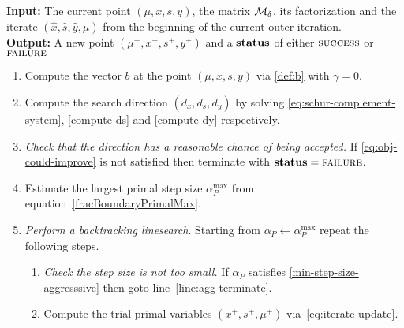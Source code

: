 \documentclass{article}
\begin{document}
\begin{algorithm}[H]
\textbf{Input:} The current point $(\mu, x, s, y)$, the matrix $\mathcal{M}_{\delta}$, its factorization and the iterate $(\hat{x}, \hat{s},  \hat{y}, \hat{\mu})$ from the beginning of the current outer iteration.  \\
\textbf{Output:} A new point $(\mu^{+}, x^{+}, s^{+}, y^{+})$ and a $\textbf{status}$ of either $\textsc{success}$ or $\textsc{failure}$
\begin{enumerate}[label*=A.{\arabic*}]
\item Compute the vector $b$ at the point $(\mu, x, s, y)$ via \eqref{def:b} with $\gamma = 0$.
\item Compute the search direction $(d_{x}, d_{s}, d_{y})$ by solving \eqref{eq:schur-complement-system}, \eqref{compute-ds} and \eqref{compute-dy} respectively.
\item \emph{Check that the direction has a reasonable chance of being accepted.} If \eqref{eq:obj-could-improve} is not satisfied then terminate with $\textbf{status} = \textsc{failure}$.
\item Estimate the largest primal step size $\alpha^{\max}_{P}$ from equation~\eqref{fracBoundaryPrimalMax}.
\item \label{agg:line:back-track} \emph{Perform a backtracking linesearch}. Starting from $\alpha_{P} \gets \alpha^{\max}_{P}$ repeat the following steps.
\begin{enumerate}[label*=.{\arabic*}]
\item \label{line:agg-back-too-small} \emph{Check the step size is not too small.} If $\alpha_{P}$ satisfies \eqref{min-step-size-aggresssive} then goto line~\ref{line:agg-terminate}.
\item Compute the trial primal variables $(x^{+}, s^{+}, \mu^{+})$ via~\eqref{eq:iterate-update}.

\end{enumerate}
\end{enumerate}
\end{algorithm}
\end{document}
